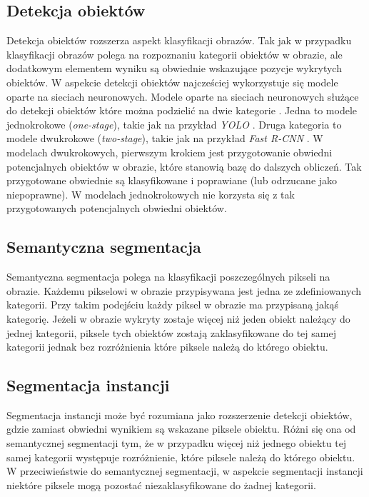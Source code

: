 \subsection*{Detekcja obiektów}
Detekcja obiektów rozszerza aspekt klasyfikacji obrazów. Tak jak w przypadku klasyfikacji obrazów polega na rozpoznaniu kategorii obiektów w obrazie, ale dodatkowym elementem wyniku są obwiednie wskazujące pozycje wykrytych obiektów. W aspekcie detekcji obiektów najcześciej wykorzystuje się modele oparte na sieciach neuronowych. Modele oparte na sieciach neuronowych służące do detekcji obiektów które można podzielić na dwie kategorie \cite{survey-deep-learning-object-dection}. Jedna to modele jednokrokowe (\textit{one-stage}), takie jak na przykład \textit{YOLO} \cite{yolo}. Druga kategoria to modele dwukrokowe (\textit{two-stage}), takie jak na przykład \textit{Fast R-CNN} \cite{fast-rcnn}. W modelach dwukrokowych, pierwszym krokiem jest przygotowanie obwiedni potencjalnych obiektów w obrazie, które stanowią bazę do dalszych obliczeń. Tak przygotowane obwiednie są klasyfikowane i poprawiane (lub odrzucane jako niepoprawne). W modelach jednokrokowych nie korzysta się z tak przygotowanych potencjalnych obwiedni obiektów.

\subsection*{Semantyczna segmentacja}
Semantyczna segmentacja polega na klasyfikacji poszczególnych pikseli na obrazie. Każdemu pikselowi w obrazie przypisywana jest jedna ze zdefiniowanych kategorii. Przy takim podejściu każdy piksel w obrazie ma przypisaną jakąś kategorię. Jeżeli w obrazie wykryty zostaje więcej niż jeden obiekt należący do jednej kategorii, piksele tych obiektów zostają zaklasyfikowane do tej samej kategorii jednak bez rozróżnienia które piksele należą do którego obiektu.
\cite{survey-semantic-segmentation}

\subsection*{Segmentacja instancji}
Segmentacja instancji może być rozumiana jako rozszerzenie detekcji obiektów, gdzie zamiast obwiedni wynikiem są wskazane piksele obiektu. Różni się ona od semantycznej segmentacji tym, że w przypadku więcej niż jednego obiektu tej samej kategorii występuje rozróżnienie, które piksele należą do którego obiektu. W przeciwieństwie do semantycznej segmentacji, w aspekcie segmentacji instancji niektóre piksele mogą pozostać niezaklasyfikowane do żadnej kategorii.

